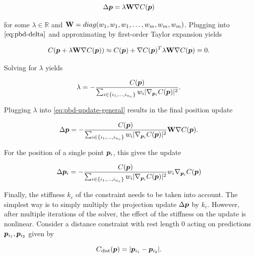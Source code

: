 \begin{equation}\label{eq:pbd-update-general}
    \Delta \bm{p} = \lambda \mathbf{W} \nabla C(\bm{p})
\end{equation}

\noindent for some $\lambda \in \mathbb{R}$ and $\mathbf{W} = diag(w_1, w_1, w_1, \ldots, w_m, w_m, w_m)$. 
Plugging into $\autoref{eq:pbd-delta}$ and approximating by first-order Taylor expansion yields

\[
    C(\bm{p} + \lambda \mathbf{W} \nabla C(\bm{p})) \approx C(\bm{p}) + \nabla C(\bm{p})^T \lambda \mathbf{W}
    \nabla C(\bm{p}) = 0.
\]

\noindent Solving for $\lambda$ yields

\begin{equation}\label{eq:pbd-lambda}
    \lambda = -\frac{C(\bm{p})}{\sum_{i \in \{ i_1, \ldots, i_{n_c} \}} w_i \vert \nabla_{\bm{p}_i}C(\bm{p}) \vert^2 }.
\end{equation}

\noindent Plugging $\lambda$ into \autoref{eq:pbd-update-general} results in the final position update

\begin{equation}\label{eq:pbd-update}
    \Delta \bm{p} = -\frac{C(\bm{p})}{\sum_{i \in \{ i_1, \ldots, i_{n_c} \}} w_i \vert \nabla_{\bm{p}_i}C(\bm{p}) \vert^2 } 
    \mathbf{W}\nabla C(\bm{p}).
\end{equation}

\noindent For the position of a single point $\bm{p}_i$, this gives the update

\begin{equation}\label{eq:pbd-update-individual}
    \Delta \bm{p}_i = -\frac{C(\bm{p})}{\sum_{i \in \{ i_1, \ldots, i_{n_c} \}} w_i \vert \nabla_{\bm{p}_i}C(\bm{p}) \vert^2 } 
    w_i \nabla_{\bm{p}_i} C(\bm{p})
\end{equation}

Finally, the stiffness $k_c$ of the constraint needs to be taken into account. The simplest way is to simply multiply the projection update
$\Delta \bm{p}$ by $k_c$. However, after multiple iterations of the solver, the effect of the stiffness on the update is nonlinear. Consider
a distance constraint with rest length 0 acting on predictions $\bm{p}_{i_1}, \bm{p}_{i_2}$ given by

\begin{equation}\label{eq:pbd-distance}
    C_{\text{dist}}(\bm{p}) = \vert \bm{p}_{i_1} - \bm{p}_{i_2} \vert.
\end{equation}

